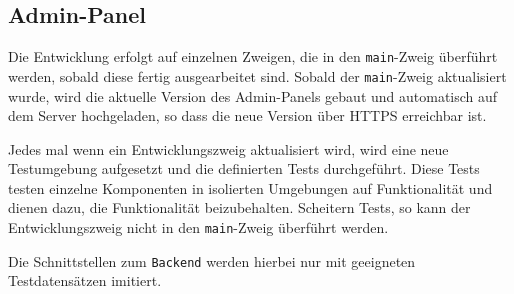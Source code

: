 \subsection{Admin-Panel}

Die Entwicklung erfolgt auf einzelnen Zweigen, die in den \verb#main#-Zweig überführt werden, sobald diese fertig ausgearbeitet sind.
Sobald der \verb#main#-Zweig aktualisiert wurde, wird die aktuelle Version des Admin-Panels gebaut und automatisch auf dem Server hochgeladen,
so dass die neue Version über HTTPS erreichbar ist.

Jedes mal wenn ein Entwicklungszweig aktualisiert wird, wird eine neue Testumgebung aufgesetzt und die definierten Tests durchgeführt.
Diese Tests testen einzelne Komponenten in isolierten Umgebungen auf Funktionalität und dienen dazu, die Funktionalität beizubehalten.
Scheitern Tests, so kann der Entwicklungszweig nicht in den \verb#main#-Zweig überführt werden.

Die Schnittstellen zum \verb#Backend# werden hierbei nur mit geeigneten Testdatensätzen imitiert.